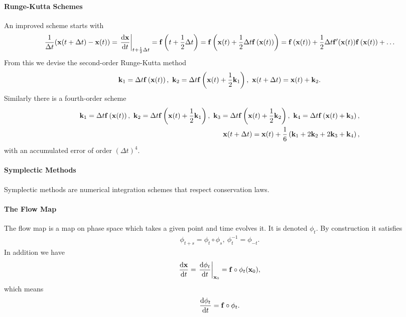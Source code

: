 \paragraph{Runge-Kutta Schemes}
An improved scheme starts with
\begin{align*}
	\frac{1}{\Delta t}(\vb{x}(t + \Delta t) - \vb{x}(t)) = \eval{\dv{\vb{x}}{t}}_{t + \frac{1}{2}\Delta t} = \vb{f}\left(t + \frac{1}{2}\Delta t\right) = \vb{f}\left(\vb{x}(t) + \frac{1}{2}\Delta t\vb{f}\left(\vb{x}(t)\right)\right) = \vb{f}\left(\vb{x}(t)\right) + \frac{1}{2}\Delta t\vb{f}\p(\vb{x}(t))\vb{f}\left(\vb{x}(t)\right) + \dots
\end{align*}
From this we devise the second-order Runge-Kutta method
\begin{align*}
	\vb{k}_{1} = \Delta t\vb{f}\left(\vb{x}(t)\right),\ \vb{k}_{2} = \Delta t\vb{f}\left(\vb{x}(t) + \frac{1}{2}\vb{k}_{1}\right),\ \vb{x}(t + \Delta t) = \vb{x}(t) + \vb{k}_{2}.
\end{align*}
Similarly there is a fourth-order scheme
\begin{align*}
	\vb{k}_{1} = \Delta t\vb{f}\left(\vb{x}(t)\right),\ \vb{k}_{2} = \Delta t\vb{f}\left(\vb{x}(t) + \frac{1}{2}\vb{k}_{1}\right),\ \vb{k}_{3} = \Delta t\vb{f}\left(\vb{x}(t) + \frac{1}{2}\vb{k}_{2}\right),\ \vb{k}_{4} = \Delta t\vb{f}\left(\vb{x}(t) + \vb{k}_{3}\right), \\
	\vb{x}(t + \Delta t) = \vb{x}(t) + \frac{1}{6}\left(\vb{k}_{1} + 2\vb{k}_{2} + 2\vb{k}_{3} + \vb{k}_{4}\right),
\end{align*}
with an accumulated error of order $(\Delta t)^{4}$.

\paragraph{Symplectic Methods}
Symplectic methods are numerical integration schemes that respect conservation laws.

\paragraph{The Flow Map}
The flow map is a map on phase space which takes a given point and time evolves it. It is denoted $\phi_{t}$. By construction it satisfies
\begin{align*}
	\phi_{t + s} = \phi_{t}\circ\phi_{s},\ \phi_{t}^{-1} = \phi_{-t}.
\end{align*}
In addition we have
\begin{align*}
	\dv{\vb{x}}{t} = \eval{\dv{\phi_{t}}{t}}_{\vb{x}_{0}} = \vb{f}\circ\phi_{t}(\vb{x}_{0}),
\end{align*}
which means
\begin{align*}
	\dv{\phi_{t}}{t} = \vb{f}\circ\phi_{t}.
\end{align*}


